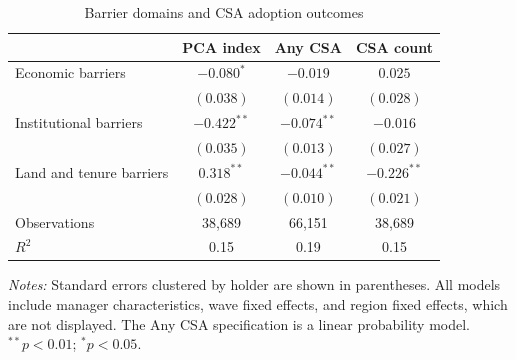 \begin{table}[htbp]
\centering
\caption{Barrier domains and CSA adoption outcomes}
\label{tab:barrier-domains}
\small
\begin{tabular}{lccc}
\toprule
 & PCA index & Any CSA & CSA count \\
\midrule
Economic barriers
    & $-0.080^{*}$ & $-0.019$ & $0.025$ \\
    & $(0.038)$ & $(0.014)$ & $(0.028)$ \\[0.3em]

Institutional barriers
    & $-0.422^{**}$ & $-0.074^{**}$ & $-0.016$ \\
    & $(0.035)$ & $(0.013)$ & $(0.027)$ \\[0.3em]

Land and tenure barriers
    & $0.318^{**}$ & $-0.044^{**}$ & $-0.226^{**}$ \\
    & $(0.028)$ & $(0.010)$ & $(0.021)$ \\
\midrule
Observations & 38,689 & 66,151 & 38,689 \\
$R^{2}$ & 0.15 & 0.19 & 0.15 \\
\bottomrule
\end{tabular}

\vspace{0.4em}
\parbox{0.95\textwidth}{\footnotesize
\textit{Notes:} Standard errors clustered by holder are shown in parentheses.
All models include manager characteristics, wave fixed effects, and region fixed
effects, which are not displayed. The Any CSA specification is a linear
probability model. $^{**}p<0.01$; $^{*}p<0.05$.
}
\end{table}
